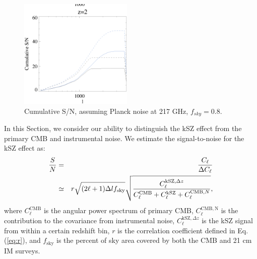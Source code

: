 \begin{figure}[tbp]
\begin{center}
\includegraphics[width=0.48\textwidth]{figure/sn_z1_z2.eps}
\end{center}
\vspace{-0.7cm}
\caption{Cumulative S/N, assuming Planck noise at 217 GHz, $f_{sky}=0.8$. 
}
\label{fig:sn}
\end{figure}
In this Section, we consider our ability to distinguish the kSZ effect from the primary CMB and instrumental noise. We estimate the signal-to-noise for the kSZ effect as:
\begin{eqnarray} 
\label{eq:sn}
    \frac{S}{N}&=&\frac{C_\ell}{\Delta C_\ell}\\\nonumber
               &\simeq&
    r\sqrt{(2\ell+1)\Delta l f_\mathrm{sky}}\sqrt{\frac{C_\ell^{\mathrm{kSZ},\Delta z}}{C_\ell^{\mathrm{CMB}}+C_\ell^\mathrm{kSZ}+C_\ell^{\mathrm{CMB},N}}},
\end{eqnarray}
 
where $C_\ell^\mathrm{CMB}$ is the angular power spectrum of primary CMB, $C_\ell^\mathrm{CMB,N}$ is the contribution to the covariance from instrumental noise, $C_\ell^{\mathrm{kSZ},\Delta z}$ is the kSZ signal from within a certain redshift bin,  
$r$ is the correlation coefficient defined in Eq.(\ref{eq:r}), and $f_\mathrm{sky}$ is the percent of sky area covered by both the CMB and 21 cm IM surveys.

